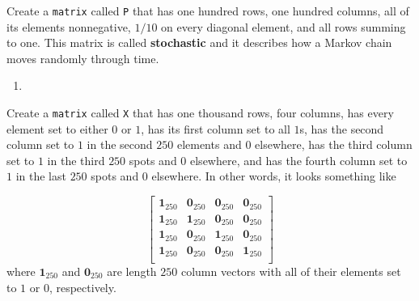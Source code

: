 \documentclass[12pt,krantz2]{krantz}
\begin{document}
Create a \texttt{matrix} called \texttt{P} that has one hundred rows, one hundred columns, all of its elements nonnegative, \(1/10\) on every diagonal element, and all rows summing to one. This matrix is called \textbf{stochastic} and it describes how a Markov chain moves randomly through time.

\begin{enumerate}
\def\labelenumi{\arabic{enumi}.}
\setcounter{enumi}{2}
\item
\end{enumerate}

Create a \texttt{matrix} called \texttt{X} that has one thousand rows, four columns, has every element set to either \(0\) or \(1\), has its first column set to all \(1\)s, has the second column set to \(1\) in the second \(250\) elements and \(0\) elsewhere, has the third column set to \(1\) in the third \(250\) spots and \(0\) elsewhere, and has the fourth column set to \(1\) in the last \(250\) spots and \(0\) elsewhere. In other words, it looks something like

\begin{equation} 
  \begin{bmatrix}
  \mathbf{1}_{250}  & \mathbf{0}_{250} & \mathbf{0}_{250} & \mathbf{0}_{250} \\
  \mathbf{1}_{250}  & \mathbf{1}_{250} & \mathbf{0}_{250} & \mathbf{0}_{250} \\
  \mathbf{1}_{250}  & \mathbf{0}_{250} & \mathbf{1}_{250} & \mathbf{0}_{250} \\
  \mathbf{1}_{250}  & \mathbf{0}_{250} & \mathbf{0}_{250} & \mathbf{1}_{250} \\
  \end{bmatrix}
\end{equation}
where \(\mathbf{1}_{250}\) and \(\mathbf{0}_{250}\) are length \(250\) column vectors with all of their elements set to \(1\) or \(0\), respectively.
\end{document}
